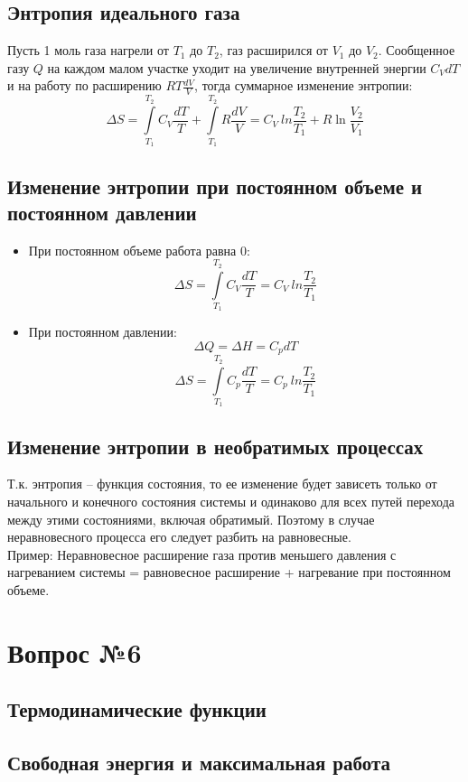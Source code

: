 \documentclass[14pt,a4paper]{scrartcl}
\begin{document}
	\subsection*{Энтропия идеального газа} 
	Пусть 1 моль газа нагрели от $T_1$ до $T_2$, газ расширился от $V_1$ до $V_2$. Сообщенное газу $Q$ на каждом малом участке уходит на увеличение внутренней энергии $C_V dT$ и на работу по расширению $ RT \frac{dV}{V} $, тогда суммарное изменение энтропии:
	\[
	\Delta{S} = \int\limits_{T_1}^{T_2} C_V \dfrac{dT}{T} + \int\limits_{T_1}^{T_2} R \dfrac{dV}{V} = 
	C_V \ ln{\frac{T_2}{T_1}} + R \ln{\frac{V_2}{V_1}} 
	\]
	
	\subsection*{Изменение энтропии при постоянном объеме и постоянном давлении} 
	\begin{itemize}
		\item При постоянном объеме работа равна 0:
		$$ 	\Delta{S} = \int\limits_{T_1}^{T_2} C_V \dfrac{dT}{T} = C_V \ ln{\frac{T_2}{T_1}} $$ 
		\item При постоянном давлении:
		$$ \Delta{Q} = \Delta{H} = C_p dT $$
		$$ \Delta{S} = \int\limits_{T_1}^{T_2} C_p \dfrac{dT}{T} = C_p \ ln{\frac{T_2}{T_1}}  $$
	\end{itemize}
	\subsection*{Изменение энтропии в необратимых процессах} 
	Т.к. энтропия -- функция состояния, то ее изменение будет зависеть только от начального и конечного состояния системы и одинаково для всех путей перехода между этими состояниями, включая обратимый. Поэтому в случае неравновесного процесса его следует разбить на равновесные. \\ 
	Пример: Неравновесное расширение газа против меньшего давления с нагреванием системы = равновесное расширение + нагревание при постоянном объеме.

\section*{Вопрос №6}

	\subsection*{Термодинамические функции} 
	
	\subsection*{Свободная энергия и максимальная работа} 
\end{document}
